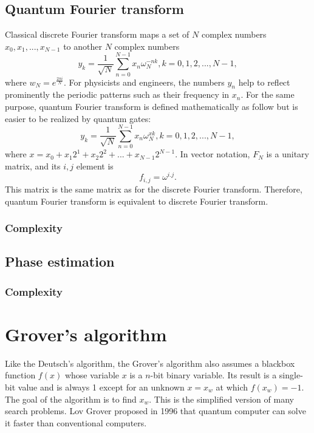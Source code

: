 \documentclass{book}
\begin{document}
\subsection{Quantum Fourier transform}
Classical discrete Fourier transform maps a set of $N$ complex numbers ${x_0, x_1, ..., x_{N-1}}$ to another $N$ complex numbers
\begin{equation}
    y_k = \frac 1 {\sqrt{N}} \sum^{N-1}_{n=0} x_n\omega_{N}^{-nk}, k = 0, 1, 2, ..., N-1,
\end{equation}
where $w_N = e^{\frac {2\pi i} N }$. For physicists and engineers, the numbers ${y_n}$ help to reflect prominently the periodic patterns such as their frequency in $x_n$. For the same purpose, quantum Fourier transform is defined mathematically as follow but is easier to be realized by quantum gates:
\begin{equation}
    y_k = \frac 1 {\sqrt{N}} \sum^{N-1}_{n=0} x_n\omega_{N}^{xk}, k = 0, 1, 2, ..., N-1,
\end{equation}
where $x = x_0 + x_1 2^1 + x_2 2^2 + ... +x_{N-1} 2^{N-1}$. In vector notation, $F_N$ is a unitary matrix, and its $i, j$ element is
\begin{equation}
    f_{i,j} = \omega^{i.j}.
\end{equation}
This matrix is the same matrix as for the discrete Fourier transform. Therefore, quantum Fourier transform is equivalent to discrete Fourier transform.

\subsubsection{Complexity}

\subsection{Phase estimation}
\subsubsection{Complexity}

\section{Grover's algorithm}
Like the Deutsch's algorithm, the Grover's algorithm also assumes a blackbox function $f(x)$ whose variable $x$ is a $n$-bit binary variable. Its result is a single-bit value and is always 1 except for an unknown $x=x_w$ at which $f(x_w)=-1$. The goal of the algorithm is to find $x_w$. This is the simplified version of many search problems. Lov Grover proposed in 1996 that quantum computer can solve it faster than conventional computers.
\end{document}
